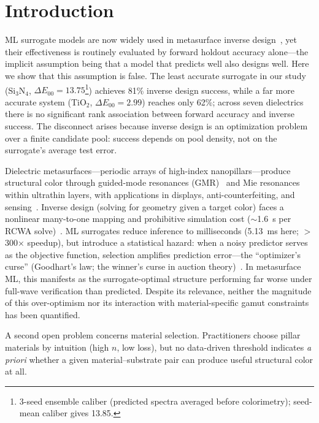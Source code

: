 \documentclass[10pt,twocolumn]{article}
\begin{document}
\section{Introduction}

ML surrogate models are now widely used in metasurface inverse design~\cite{ref8,ref19,ref20,ref21,ref23,ref24}, yet their effectiveness is routinely evaluated by forward holdout accuracy alone---the implicit assumption being that a model that predicts well also designs well. Here we show that this assumption is false. The least accurate surrogate in our study (Si$_3$N$_4$, $\Delta E_{00} = 13.75$\footnote{3-seed ensemble caliber (predicted spectra averaged before colorimetry); seed-mean caliber gives 13.85.}) achieves 81\% inverse design success, while a far more accurate system (TiO$_2$, $\Delta E_{00} = 2.99$) reaches only 62\%; across seven dielectrics there is no significant rank association between forward accuracy and inverse success. The disconnect arises because inverse design is an optimization problem over a finite candidate pool: success depends on pool density, not on the surrogate's average test error.

Dielectric metasurfaces---periodic arrays of high-index nanopillars---produce structural color through guided-mode resonances (GMR)~\cite{ref15} and Mie resonances within ultrathin layers, with applications in displays, anti-counterfeiting, and sensing~\cite{ref1,ref4,ref28}. Inverse design (solving for geometry given a target color) faces a nonlinear many-to-one mapping and prohibitive simulation cost ($\sim$1.6~s per RCWA solve)~\cite{ref6,ref7,ref8}. ML surrogates reduce inference to milliseconds (5.13~ms here; $>$300$\times$ speedup), but introduce a statistical hazard: when a noisy predictor serves as the objective function, selection amplifies prediction error---the ``optimizer's curse'' (Goodhart's law; the winner's curse in auction theory)~\cite{ref13,ref14,ref22}. In metasurface ML, this manifests as the surrogate-optimal structure performing far worse under full-wave verification than predicted. Despite its relevance, neither the magnitude of this over-optimism nor its interaction with material-specific gamut constraints has been quantified.

A second open problem concerns material selection. Practitioners choose pillar materials by intuition (high $n$, low loss), but no data-driven threshold indicates \textit{a priori} whether a given material--substrate pair can produce useful structural color at all.
\end{document}

